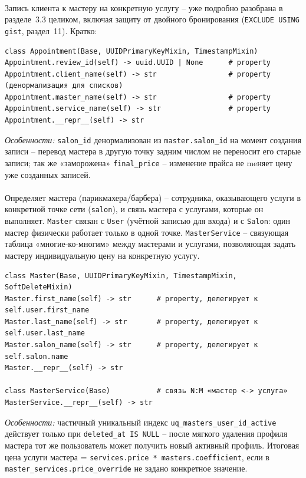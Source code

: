 \paragraph{}
Запись клиента к мастеру на конкретную услугу -- уже подробно разобрана в
разделе~3.3 целиком, включая защиту от двойного бронирования
(\texttt{EXCLUDE USING gist}, раздел~11). Кратко:
\begin{verbatim}
class Appointment(Base, UUIDPrimaryKeyMixin, TimestampMixin)
Appointment.review_id(self) -> uuid.UUID | None      # property
Appointment.client_name(self) -> str                 # property (денормализация для списков)
Appointment.master_name(self) -> str                 # property
Appointment.service_name(self) -> str                # property
Appointment.__repr__(self) -> str
\end{verbatim}
\textit{Особенности:} \texttt{salon_id} денормализован из
\texttt{master.salon_id} на момент создания записи -- перевод мастера в
другую точку задним числом не переносит его старые записи; так же
«заморожена» \texttt{final_price} -- изменение прайса не meняет цену уже
созданных записей.

\paragraph{}
Определяет мастера (парикмахера/барбера) -- сотрудника, оказывающего
услуги в конкретной точке сети (\texttt{salon}), и связь мастера с
услугами, которые он выполняет. \texttt{Master} связан с \texttt{User}
(учётной записью для входа) и с \texttt{Salon}: один мастер физически
работает только в одной точке. \texttt{MasterService} -- связующая
таблица «многие-ко-многим» между мастерами и услугами, позволяющая
задать мастеру индивидуальную цену на конкретную услугу.
\begin{verbatim}
class Master(Base, UUIDPrimaryKeyMixin, TimestampMixin, SoftDeleteMixin)
Master.first_name(self) -> str      # property, делегирует к self.user.first_name
Master.last_name(self) -> str       # property, делегирует к self.user.last_name
Master.salon_name(self) -> str      # property, делегирует к self.salon.name
Master.__repr__(self) -> str

class MasterService(Base)           # связь N:M «мастер <-> услуга»
MasterService.__repr__(self) -> str
\end{verbatim}
\textit{Особенности:} частичный уникальный индекс
\texttt{uq_masters_user_id_active} действует только при
\texttt{deleted_at IS NULL} -- после мягкого удаления профиля мастера тот
же пользователь может получить новый активный профиль. Итоговая цена
услуги мастера = \texttt{services.price * masters.coefficient}, если в
\texttt{master_services.price_override} не задано конкретное значение.

